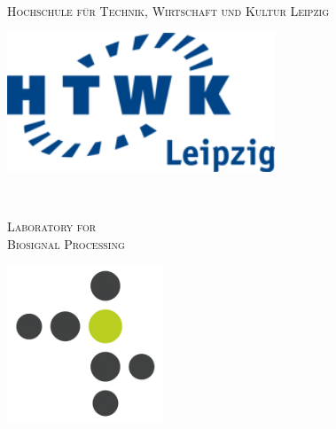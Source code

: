 \begin{titlepage}

\newcommand{\HRule}{\rule{\linewidth}{0.5mm}} %

 

\center

\begin{minipage}{0.48\textwidth}
\begin{flushleft}
\large \textsc{Hochschule für Technik, Wirtschaft und Kultur Leipzig}\\[1.3cm] %
\end{flushleft}
\begin{center}
\includegraphics[width=0.6\textwidth, center]{bilder/HTWK_Logo_RGB.png}\\
\end{center}
\end{minipage}
~
\begin{minipage}{0.48\textwidth}
\begin{flushright}
\large \textsc{Laboratory for \\ Biosignal Processing}\\[0.95cm] %
\end{flushright}
\begin{center}
\includegraphics[width=0.35\textwidth, center]{bilder/labp_logo.png}\\
\end{center}


\end{minipage}
\end{titlepage}
